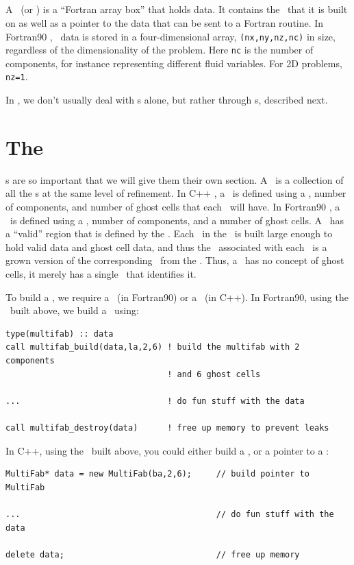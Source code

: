 \subsection{\FArrayBox}

A \FArrayBox\ (or \Fab) is a ``Fortran array box'' that holds data.  It contains the
\BoxType\ that it is built on as well as a pointer to the data 
that can be sent to a Fortran routine.
In Fortran90 \BoxLib, \Fab\ data is stored in a four-dimensional array,
{\tt (nx,ny,nz,nc)} in size, regardless of the dimensionality of the
problem.  Here {\tt nc} is the number of components, for instance
representing different fluid variables.  For 2D problems, {\tt nz=1}.

In \BoxLib, we don't usually deal with 
\Fab s alone, but rather through \MultiFab s, described next.

\section{The \MultiFab}
\MultiFab s are so important that we will give them their own section.
A \MultiFab\ is a collection of all the \Fab s at the same level of
refinement.  In C++ \BoxLib, a \MultiFab\ is defined using a \BoxArray,
number of components, and number of ghost cells that each \Fab\
will have.  In Fortran90 \BoxLib, a \MultiFab\ is defined using a \layout,
number of components, and a number of ghost cells.
A \MultiFab\ has a ``valid'' region that is defined by 
the \BoxArray.  Each \Fab\ in the \MultiFab\ is built large enough 
to hold valid data and ghost cell data, and thus the \BoxType\ associated with
each \Fab\ is a grown version of the corresponding \BoxType\ from the \BoxArray.
Thus, a \Fab\ has no concept 
of ghost cells, it merely has a single \BoxType\ that identifies it.

To build a \MultiFab, we require a \layout\ (in Fortran90) or a \BoxArray\ (in C++).
In Fortran90, using the \layout\ built above, we build a \MultiFab\ using:
\begin{lstlisting}[language={[gnu]make},mathescape=false]
type(multifab) :: data
call multifab_build(data,la,2,6) ! build the multifab with 2 components 
                                 ! and 6 ghost cells

...                              ! do fun stuff with the data

call multifab_destroy(data)      ! free up memory to prevent leaks
\end{lstlisting}
In C++, using the \BoxArray\ built above, you could either build a \MultiFab, 
or a pointer to a \MultiFab:
\begin{lstlisting}[language={[gnu]make},mathescape=false]
MultiFab* data = new MultiFab(ba,2,6);     // build pointer to MultiFab

...                                        // do fun stuff with the data

delete data;                               // free up memory
\end{lstlisting}

